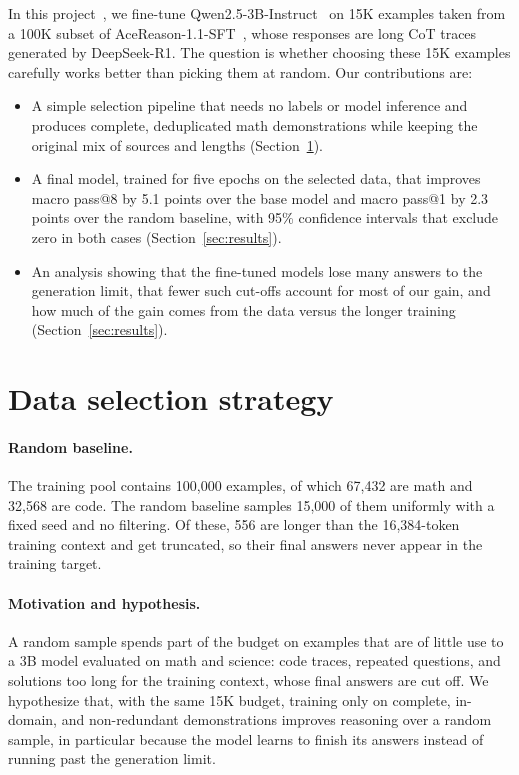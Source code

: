 \documentclass{article}
\makeatletter
\newcommand{\passk}[1]{pass@#1}
\makeatother
\begin{document}
In this project~\citep{course}, we fine-tune Qwen2.5-3B-Instruct~\citep{qwen25} on 15K examples taken from a 100K subset of
AceReason-1.1-SFT~\citep{acereason11}, whose responses are long CoT traces generated by DeepSeek-R1. The question is whether
choosing these 15K examples carefully works better than picking them at random. Our contributions are:
\begin{itemize}[leftmargin=*,itemsep=2pt,topsep=4pt]
  \item A simple selection pipeline that needs no labels or model inference and produces complete, deduplicated math
        demonstrations while keeping the original mix of sources and lengths (Section~\ref{sec:data}).
  \item A final model, trained for five epochs on the selected data, that improves macro \passk{8} by 5.1 points over the base
        model and macro \passk{1} by 2.3 points over the random baseline, with 95\% confidence intervals that exclude zero in
        both cases (Section~\ref{sec:results}).
  \item An analysis showing that the fine-tuned models lose many answers to the generation limit, that fewer such cut-offs
        account for most of our gain, and how much of the gain comes from the data versus the longer training
        (Section~\ref{sec:results}).
\end{itemize}

\section{Data selection strategy}\label{sec:data}

\paragraph{Random baseline.} The training pool contains 100,000 examples, of which 67,432 are math and 32,568 are code. The
random baseline samples 15,000 of them uniformly with a fixed seed and no filtering. Of these, 556 are longer than the
16,384-token training context and get truncated, so their final answers never appear in the training target.

\paragraph{Motivation and hypothesis.} A random sample spends part of the budget on examples that are of little use to a 3B
model evaluated on math and science: code traces, repeated questions, and solutions too long for the training context, whose
final answers are cut off. We hypothesize that, with the same 15K budget, training only on complete, in-domain, and
non-redundant demonstrations improves reasoning over a random sample, in particular because the model learns to finish its
answers instead of running past the generation limit.
\end{document}
